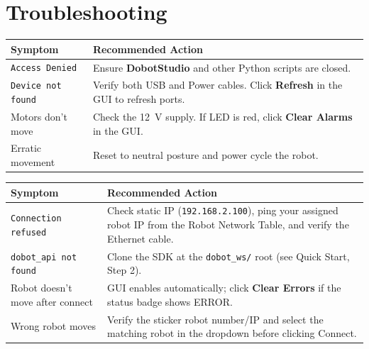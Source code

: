 \documentclass[11pt,a4paper]{article}
\begin{document}
\section{Troubleshooting}

\begin{tcolorbox}[infobox, title={Common Magician Connection Issues}]
\begin{tabularx}{\linewidth}{@{}lX@{}}
  \toprule
  \textbf{Symptom} & \textbf{Recommended Action} \\
  \midrule
  \texttt{Access Denied}    & Ensure \textbf{DobotStudio} and other Python scripts are closed. \\
  \texttt{Device not found} & Verify both USB and Power cables. Click \textbf{Refresh} in the GUI to refresh ports. \\
  Motors don't move         & Check the \qty{12}{\V} supply. If LED is red, click \textbf{Clear Alarms} in the GUI. \\
  Erratic movement          & Reset to neutral posture and power cycle the robot. \\
  \bottomrule
\end{tabularx}
\end{tcolorbox}

\vspace{6pt}

\begin{tcolorbox}[infobox, title={MG400 Connection Issues}]
\begin{tabularx}{\linewidth}{@{}lX@{}}
  \toprule
  \textbf{Symptom} & \textbf{Recommended Action} \\
  \midrule
  \texttt{Connection refused}     & Check static IP (\texttt{192.168.2.100}), ping your assigned robot IP from the Robot Network Table, and verify the Ethernet cable. \\
  \texttt{dobot\_api not found}   & Clone the SDK at the \texttt{dobot\_ws/} root (see Quick Start, Step 2). \\
  Robot doesn't move after connect & GUI enables automatically; click \textbf{Clear Errors} if the status badge shows ERROR. \\
  Wrong robot moves               & Verify the sticker robot number/IP and select the matching robot in the dropdown before clicking Connect. \\
  \bottomrule
\end{tabularx}
\end{tcolorbox}
\end{document}
